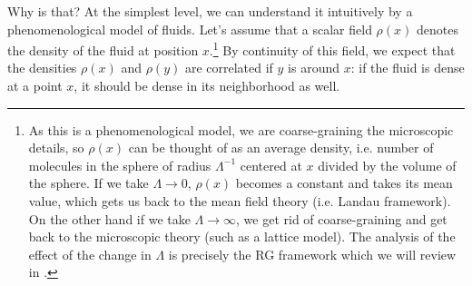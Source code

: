 Why is that? At the simplest level, we can understand it intuitively by a phenomenological model of fluids. Let's assume that a scalar field $\rho(x)$ denotes the density of the fluid at position $x$.\footnote{As this is a phenomenological model, we are coarse-graining the microscopic details, so $\rho(x)$ can be thought of as an average density, i.e. number of molecules in the sphere of radius $\Lambda^{-1}$ centered at $x$ divided by the volume of the sphere. If we take $\Lambda\rightarrow0$, $\rho(x)$ becomes a constant and takes its mean value, which gets us back to the mean field theory (i.e. Landau framework). On the other hand if we take $\Lambda\rightarrow\infty$, we get rid of coarse-graining and get back to the microscopic theory (such as a lattice model). The analysis of the effect of the change in $\Lambda$ is precisely the RG framework which we will review in \secref{\ref{sec: review of RG}}.} By continuity of this field, we expect that the densities $\rho(x)$ and $\rho(y)$ are correlated if $y$ is around $x$: if the fluid is dense at a point $x$, it should be dense in its neighborhood as well.

